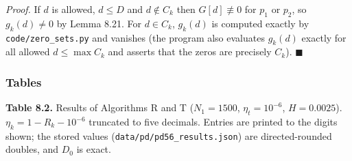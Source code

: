 \emph{Proof.} If \(d\) is allowed, \(d\le D\) and \(d\notin C_k\) then \(G[d]\not\equiv0\) for \(p_1\) or \(p_2\), so \(g_k(d)\ne0\) by Lemma 8.21. For \(d\in C_k\), \(g_k(d)\) is computed exactly by \texttt{code/zero\_sets.py} and vanishes (the program also evaluates \(g_k(d)\) exactly for all allowed \(d\le\max C_k\) and asserts that the zeros are precisely \(C_k\)). \(\blacksquare\)

\subsubsection{Tables}\label{tables}

\textbf{Table 8.2.} Results of Algorithms R and T (\(N_1=1500\), \(\eta_t=10^{-6}\), \(H=0.0025\)). \(\eta_k=1-R_k-10^{-6}\) truncated to five decimals. Entries are printed to the digits shown; the stored values (\texttt{data/pd/pd56\_results.json}) are directed-rounded doubles, and \(D_0\) is exact.

